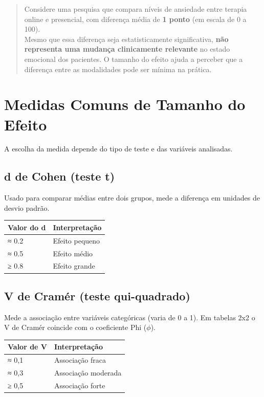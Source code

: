 \documentclass[
]{book}
\newcounter{none} %
\begin{document}
\begin{quote}
Considere uma pesquisa que compara níveis de ansiedade entre terapia online e presencial, com diferença média de \textbf{1 ponto} (em escala de 0 a 100).\\
Mesmo que essa diferença seja estatisticamente significativa, \textbf{não representa uma mudança clinicamente relevante} no estado emocional dos pacientes. O tamanho do efeito ajuda a perceber que a diferença entre as modalidades pode ser mínima na prática.
\end{quote}

\section{Medidas Comuns de Tamanho do Efeito}\label{medidas-comuns-de-tamanho-do-efeito}

A escolha da medida depende do tipo de teste e das variáveis analisadas.

\subsection{d de Cohen (teste t)}\label{d-de-cohen-teste-t}

Usado para comparar médias entre dois grupos, mede a diferença em unidades de desvio padrão.

{\def\LTcaptype{none} %
\begin{longtable}[]{@{}ll@{}}
\toprule\noalign{}
Valor do d & Interpretação \\
\midrule\noalign{}
\endhead
\bottomrule\noalign{}
\endlastfoot
≈ 0.2 & Efeito pequeno \\
≈ 0.5 & Efeito médio \\
≥ 0.8 & Efeito grande \\
\end{longtable}
}

\subsection{V de Cramér (teste qui-quadrado)}\label{v-de-cramuxe9r-teste-qui-quadrado}

Mede a associação entre variáveis categóricas (varia de 0 a 1). Em tabelas 2x2 o V de Cramér coincide com o coeficiente Phi (\(\phi\)).

{\def\LTcaptype{none} %
\begin{longtable}[]{@{}ll@{}}
\toprule\noalign{}
Valor de V & Interpretação \\
\midrule\noalign{}
\endhead
\bottomrule\noalign{}
\endlastfoot
≈ 0,1 & Associação fraca \\
≈ 0,3 & Associação moderada \\
≥ 0,5 & Associação forte \\
\end{longtable}
}
\end{document}
